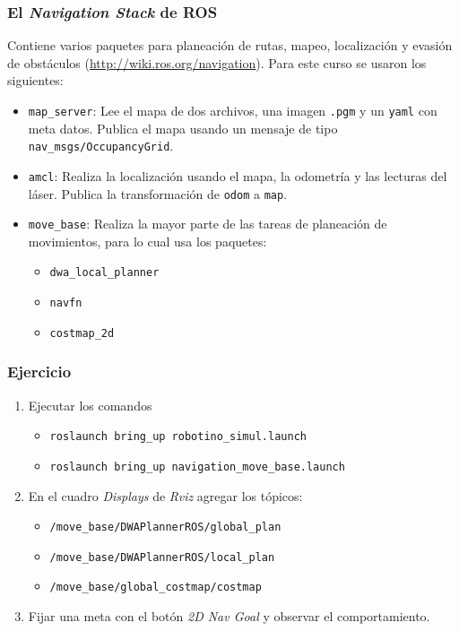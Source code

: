 \documentclass[10pt,spanish,aspectratio=1610]{beamer}
\begin{document}
\begin{frame}\frametitle{El \textit{Navigation Stack} de ROS}
  Contiene varios paquetes para planeación de rutas, mapeo, localización y evasión de obstáculos (\url{http://wiki.ros.org/navigation}). Para este curso se usaron los siguientes:
  \begin{itemize}
  \item \texttt{map\_server}: Lee el mapa de dos archivos, una imagen \texttt{.pgm} y un \texttt{yaml} con meta datos. Publica el mapa usando un mensaje de tipo \texttt{nav\_msgs/OccupancyGrid}.
  \item \texttt{amcl}: Realiza la localización usando el mapa, la odometría y las lecturas del láser. Publica la transformación de \texttt{odom} a \texttt{map}.
  \item  \texttt{move\_base}: Realiza la mayor parte de las tareas de planeación de movimientos, para lo cual usa los paquetes:
    \begin{itemize}
    \item \texttt{dwa\_local\_planner}
    \item \texttt{navfn}
    \item \texttt{costmap\_2d}
    \end{itemize}
  \end{itemize}
\end{frame}

\begin{frame}\frametitle{Ejercicio}
  \begin{enumerate}
  \item Ejecutar los comandos
    \begin{itemize}
    \item \texttt{roslaunch bring\_up robotino\_simul.launch}
    \item \texttt{roslaunch bring\_up navigation\_move\_base.launch}
    \end{itemize}
  \item En el cuadro \textit{Displays} de \textit{Rviz} agregar los tópicos:
    \begin{itemize}
    \item \texttt{/move\_base/DWAPlannerROS/global\_plan}
    \item \texttt{/move\_base/DWAPlannerROS/local\_plan}
    \item \texttt{/move\_base/global\_costmap/costmap}
    \end{itemize}
    \item Fijar una meta con el botón \textit{2D Nav Goal} y observar el comportamiento.
  \end{enumerate}
\end{frame}
\end{document}
